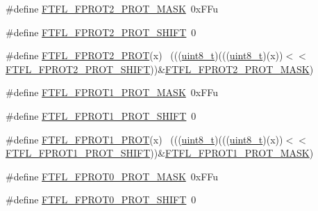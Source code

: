 \begin{DoxyCompactItemize}
\item 
\#define \hyperlink{group___f_t_f_l___register___masks_gab025f3c9db253e8e5cf6b34b35d9e9f4}{F\+T\+F\+L\+\_\+\+F\+P\+R\+O\+T2\+\_\+\+P\+R\+O\+T\+\_\+\+M\+A\+SK}~0x\+F\+Fu
\item 
\#define \hyperlink{group___f_t_f_l___register___masks_ga1154643b8b983c891b387d11ea2c014b}{F\+T\+F\+L\+\_\+\+F\+P\+R\+O\+T2\+\_\+\+P\+R\+O\+T\+\_\+\+S\+H\+I\+FT}~0
\item 
\#define \hyperlink{group___f_t_f_l___register___masks_ga093261d60503e2fff96bb5073530d60a}{F\+T\+F\+L\+\_\+\+F\+P\+R\+O\+T2\+\_\+\+P\+R\+OT}(x)                                        ~(((\hyperlink{_p_e___types_8h_aba7bc1797add20fe3efdf37ced1182c5}{uint8\+\_\+t})(((\hyperlink{_p_e___types_8h_aba7bc1797add20fe3efdf37ced1182c5}{uint8\+\_\+t})(x))$<$$<$\hyperlink{group___f_t_f_l___register___masks_ga1154643b8b983c891b387d11ea2c014b}{F\+T\+F\+L\+\_\+\+F\+P\+R\+O\+T2\+\_\+\+P\+R\+O\+T\+\_\+\+S\+H\+I\+FT}))\&\hyperlink{group___f_t_f_l___register___masks_gab025f3c9db253e8e5cf6b34b35d9e9f4}{F\+T\+F\+L\+\_\+\+F\+P\+R\+O\+T2\+\_\+\+P\+R\+O\+T\+\_\+\+M\+A\+SK})
\item 
\#define \hyperlink{group___f_t_f_l___register___masks_ga5c9f8e4883ba60b62c7c6c4086e457e2}{F\+T\+F\+L\+\_\+\+F\+P\+R\+O\+T1\+\_\+\+P\+R\+O\+T\+\_\+\+M\+A\+SK}~0x\+F\+Fu
\item 
\#define \hyperlink{group___f_t_f_l___register___masks_gafc33561153fee9b1baaaed4d88d684b0}{F\+T\+F\+L\+\_\+\+F\+P\+R\+O\+T1\+\_\+\+P\+R\+O\+T\+\_\+\+S\+H\+I\+FT}~0
\item 
\#define \hyperlink{group___f_t_f_l___register___masks_ga86a6d2225008135b0e9ebb2808b78227}{F\+T\+F\+L\+\_\+\+F\+P\+R\+O\+T1\+\_\+\+P\+R\+OT}(x)                                        ~(((\hyperlink{_p_e___types_8h_aba7bc1797add20fe3efdf37ced1182c5}{uint8\+\_\+t})(((\hyperlink{_p_e___types_8h_aba7bc1797add20fe3efdf37ced1182c5}{uint8\+\_\+t})(x))$<$$<$\hyperlink{group___f_t_f_l___register___masks_gafc33561153fee9b1baaaed4d88d684b0}{F\+T\+F\+L\+\_\+\+F\+P\+R\+O\+T1\+\_\+\+P\+R\+O\+T\+\_\+\+S\+H\+I\+FT}))\&\hyperlink{group___f_t_f_l___register___masks_ga5c9f8e4883ba60b62c7c6c4086e457e2}{F\+T\+F\+L\+\_\+\+F\+P\+R\+O\+T1\+\_\+\+P\+R\+O\+T\+\_\+\+M\+A\+SK})
\item 
\#define \hyperlink{group___f_t_f_l___register___masks_ga646d72cc3ed2260faa773c4aa7950448}{F\+T\+F\+L\+\_\+\+F\+P\+R\+O\+T0\+\_\+\+P\+R\+O\+T\+\_\+\+M\+A\+SK}~0x\+F\+Fu
\item 
\#define \hyperlink{group___f_t_f_l___register___masks_gaa187bf5bd9042ecb56239610b9636ad8}{F\+T\+F\+L\+\_\+\+F\+P\+R\+O\+T0\+\_\+\+P\+R\+O\+T\+\_\+\+S\+H\+I\+FT}~0

\end{DoxyCompactItemize}
